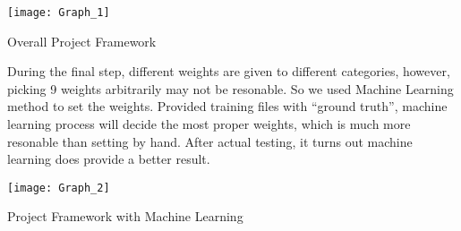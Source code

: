 \documentclass[../main.tex]{subfiles}
\begin{document}
\begin{figurehere}
\centering \texttt{[image: Graph\_1]} 
\caption{Overall Project Framework} \label{fig:Graph_1}
\end{figurehere}

During the final step, different weights are given to different categories, however, picking 9 weights arbitrarily may not be resonable. So we used Machine Learning method to set the weights. Provided training files with ``ground truth'', machine learning process will decide the most proper weights, which is much more resonable than setting by hand. After actual testing, it turns out machine learning does provide a better result.

\begin{figurehere}
\centering \texttt{[image: Graph\_2]} 
\caption{Project Framework with Machine Learning} \label{fig:Graph_2}
\end{figurehere}
\end{document}
